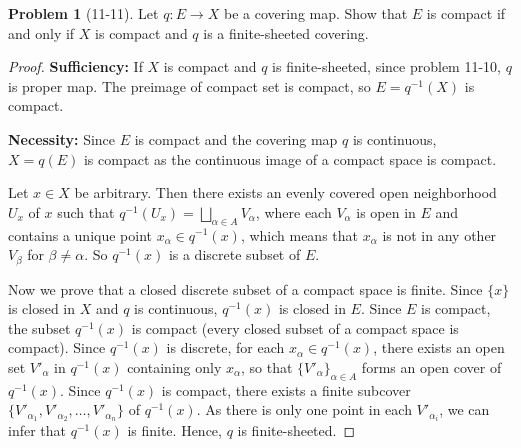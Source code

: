 \documentclass[11pt, a4paper]{article}
\theoremstyle{definition}
\newtheorem{prob}{Problem}
\newenvironment{problem}[1][]{\begin{prob}[#1]\normalfont}{\end{prob}\vspace{1.5em}}
\begin{document}
\begin{problem}[11-11]
    Let $q: E \to X$ be a covering map. Show that $E$ is compact if and only if $X$ is compact and $q$ is a 
    finite-sheeted covering.
    \begin{proof}
        \item[$1^ \circ$] \textbf{Sufficiency:} If $X$ is compact and $q$ is finite-sheeted, since problem 11-10, $q$ is 
        proper map. The preimage of compact set is compact, so $E = q^{-1}(X)$ is compact.
        \item[$2^ \circ$] \textbf{Necessity:} Since $E$ is compact and the covering map $q$ is continuous, $X = q(E)$ is compact 
        as the continuous image of a compact space is compact. 
        
        Let $x \in X$ be arbitrary. Then there exists an evenly covered open neighborhood $U_x$ of $x$ such that 
        $q^{-1}(U_x) = \bigsqcup_{\alpha \in A} V_\alpha $, where each $V_\alpha $ is open in $E$ and contains a 
        unique point $x_\alpha \in q^{-1}(x)$, which means that $x_\alpha$ is not in any other 
        $V_\beta$ for $\beta \neq \alpha$. So $q^{-1}(x)$ is a discrete subset of $E$. 

        Now we prove that a closed discrete subset of a compact space is finite. Since $\{x\}$ is closed in $X$ and $q$ is
        continuous, $q^{-1}(x)$ is closed in $E$. Since $E$ is compact, the subset $q^{-1}(x)$ is compact (every closed 
        subset of a compact space is compact). Since $q^{-1}(x)$ is discrete, for each $x_\alpha \in q^{-1}(x)$, there 
        exists an open set $V'_\alpha$ in $q^{-1}(x)$ containing only $x_\alpha$, so that $\{V'_\alpha\}_{\alpha \in A}$ 
        forms an open cover of $q^{-1}(x)$. Since $q^{-1}(x)$ is compact, there exists a finite subcover 
        $\{V'_{\alpha_1}, V'_{\alpha_2}, \ldots, V'_{\alpha_n}\}$ of $q^{-1}(x)$. As there is only one point in each 
        $V'_{\alpha_i}$, we can infer that $q^{-1}(x)$ is finite. Hence, $q$ is finite-sheeted.
        
        




        

\end{proof}
\end{problem}
\end{document}
